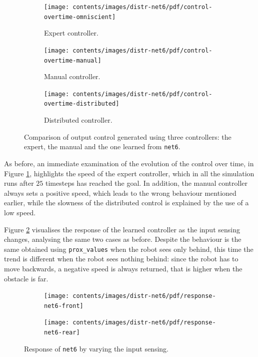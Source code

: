 \begin{figure}[!htb]
	\centering
	\begin{subfigure}[h]{0.3\textwidth}
		\centering
		\texttt{[image: contents/images/distr-net6/pdf/control-overtime-omniscient]}%
		\caption{Expert controller.}
	\end{subfigure}
	\hfill
	\begin{subfigure}[h]{0.3\textwidth}
		\centering
		\texttt{[image: contents/images/distr-net6/pdf/control-overtime-manual]}%
		\caption{Manual controller.}
	\end{subfigure}
	\hfill
	\begin{subfigure}[h]{0.3\textwidth}
		\centering
		\texttt{[image: contents/images/distr-net6/pdf/control-overtime-distributed]}
		\caption{Distributed controller.}
	\end{subfigure}
	\caption[Evaluation of the control learned by \texttt{net6}.]{Comparison 
		of output control generated using three controllers: the expert, the manual 
		and the one learned from \texttt{net6}.}
	\label{fig:net6control}
\end{figure}

As before, an immediate examination of the evolution of the control over 
time, in Figure \ref{fig:net6control}, highlights the speed of the expert 
controller, which in all the simulation runs after $25$ timesteps has reached the 
goal. 
In addition, the manual controller always sets a positive speed, which leads to the 
wrong behaviour mentioned earlier, while the slowness of the distributed 
control is explained by the use of a low speed.

Figure \ref{fig:net6responsesensors} visualises the response of the learned 
controller as the input sensing changes, analysing the same two cases as before. 
Despite the behaviour is the same obtained using \texttt{prox\_values} when the 
robot sees only behind, this time the trend is different when the robot sees 
nothing behind: since the robot has to move backwards, a negative speed is 
always returned, that is higher when the obstacle is far. 
\begin{figure}[!htb]
	\centering
	\begin{subfigure}[h]{0.49\textwidth}
		\centering
		\texttt{[image: contents/images/distr-net6/pdf/response-net6-front]}%
	\end{subfigure}
	\hfill
	\begin{subfigure}[h]{0.49\textwidth}
		\centering
		\texttt{[image: contents/images/distr-net6/pdf/response-net6-rear]}
	\end{subfigure}
	\caption{Response of \texttt{net6} by varying the input sensing.}
	\label{fig:net6responsesensors}
\end{figure}

